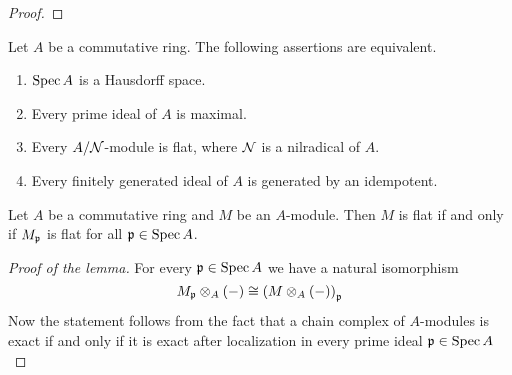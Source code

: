 \begin{proof}
\end{proof}

\begin{theorem}
Let $A$ be a commutative ring. The following assertions are equivalent.
\begin{enumerate}[label=\emph{\textbf{(\roman*)}}, leftmargin=1.5em]
\item $\mathrm{Spec}\, A$ is a Hausdorff space.
\item Every prime ideal of $A$ is maximal.
\item Every $A/{\mathcal N}$-module is flat, where ${\mathcal N}$ is a nilradical of $A$.
\item Every finitely generated ideal of $A$ is generated by an idempotent.
\end{enumerate}
\end{theorem}

\begin{lemma}\label{lemma:flatness_in_stalks}
Let $A$ be a commutative ring and $M$ be an $A$-module. Then $M$ is flat if and only if $M_{\mathfrak{p}}$ is flat for all $\mathfrak{p}\in \mathrm{Spec}\, A$.
\end{lemma}
\begin{proof}[Proof of the lemma]
For every $\mathfrak{p}\in \mathrm{Spec}\, A$ we have a natural isomorphism
$$M_{\mathfrak{p}}\otimes_A(-) \cong \left(M\otimes_A(-)\right)_{\mathfrak{p}}$$
Now the statement follows from the fact that a chain complex of $A$-modules is exact if and only if it is exact after localization in every prime ideal $\mathfrak{p}\in \mathrm{Spec}\, A$
\end{proof}

